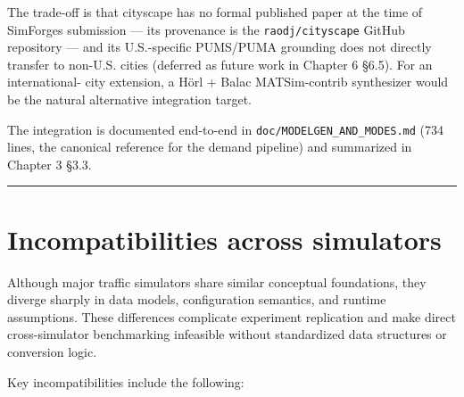 The trade-off is that cityscape has no formal published paper at the
time of SimForge\textquotesingle s submission --- its provenance is the
\texttt{raodj/cityscape} GitHub repository --- and its U.S.-specific
PUMS/PUMA grounding does not directly transfer to non-U.S. cities
(deferred as future work in Chapter 6 §6.5). For an international- city
extension, a Hörl + Balac MATSim-contrib synthesizer would be the
natural alternative integration target.

The integration is documented end-to-end in
\texttt{doc/MODELGEN\_AND\_MODES.md} (734 lines, the canonical reference
for the demand pipeline) and summarized in Chapter 3 §3.3.

\begin{center}\rule{0.5\linewidth}{0.5pt}\end{center}

\section{Incompatibilities across
simulators}\label{24-incompatibilities-across-simulators}

Although major traffic simulators share similar conceptual foundations,
they diverge sharply in data models, configuration semantics, and
runtime assumptions. These differences complicate experiment replication
and make direct cross-simulator benchmarking infeasible without
standardized data structures or conversion logic.

Key incompatibilities include the following:

